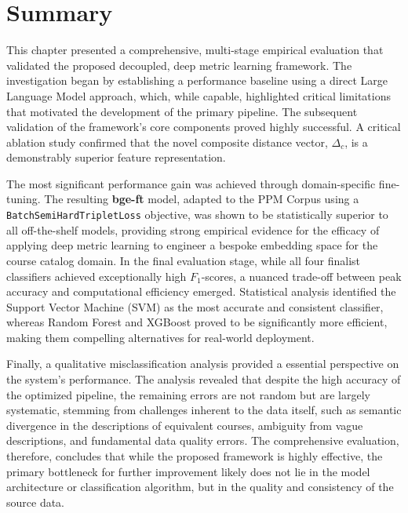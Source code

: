 \section{Summary}\label{ch:4.7}
This chapter presented a comprehensive, multi-stage empirical evaluation that validated the proposed decoupled, deep metric learning framework. The investigation began by establishing a performance baseline using a direct Large Language Model approach, which, while capable, highlighted critical limitations that motivated the development of the primary pipeline. The subsequent validation of the framework's core components proved highly successful. A critical ablation study confirmed that the novel composite distance vector, \(\Delta_c\), is a demonstrably superior feature representation.

The most significant performance gain was achieved through domain-specific fine-tuning. The resulting \textbf{bge-ft} model, adapted to the PPM Corpus using a \verb|BatchSemiHardTripletLoss| objective, was shown to be statistically superior to all off-the-shelf models, providing strong empirical evidence for the efficacy of applying deep metric learning to engineer a bespoke embedding space for the course catalog domain. In the final evaluation stage, while all four finalist classifiers achieved exceptionally high \(F_1\)-scores, a nuanced trade-off between peak accuracy and computational efficiency emerged. Statistical analysis identified the Support Vector Machine (SVM) as the most accurate and consistent classifier, whereas Random Forest and XGBoost proved to be significantly more efficient, making them compelling alternatives for real-world deployment.

Finally, a qualitative misclassification analysis provided a essential perspective on the system's performance. The analysis revealed that despite the high accuracy of the optimized pipeline, the remaining errors are not random but are largely systematic, stemming from challenges inherent to the data itself, such as semantic divergence in the descriptions of equivalent courses, ambiguity from vague descriptions, and fundamental data quality errors. The comprehensive evaluation, therefore, concludes that while the proposed framework is highly effective, the primary bottleneck for further improvement likely does not lie in the model architecture or classification algorithm, but in the quality and consistency of the source data.